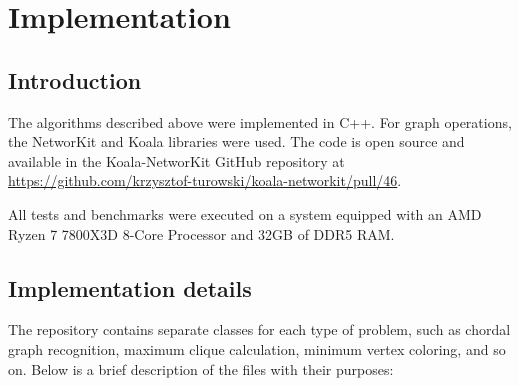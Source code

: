 \chapter{Implementation}
\label{ch:implementation}

\section{Introduction}

The algorithms described above were implemented in C++. For graph operations, the NetworKit and Koala libraries were used. The code is open source and available in the Koala-NetworKit GitHub repository at \url{https://github.com/krzysztof-turowski/koala-networkit/pull/46}.

All tests and benchmarks were executed on a system equipped with an AMD Ryzen 7 7800X3D 8-Core Processor and 32GB of DDR5 RAM. 

\section{Implementation details}

The repository contains separate classes for each type of problem, such as chordal graph recognition, maximum clique calculation, minimum vertex coloring, and so on. Below is a brief description of the files with their purposes:

